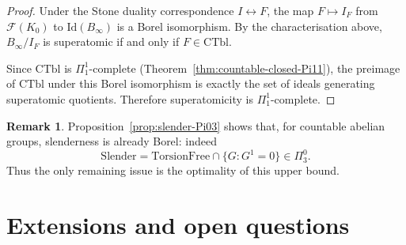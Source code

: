 \documentclass[12pt,fleqn,a4paper]{amsart}
\numberwithin{equation}{section}
\theoremstyle{definition}
\newtheorem{remark}[theorem]{Remark}
\newcommand{\Id}{\mathrm{Id}}
\newcommand{\CTbl}{\mathrm{CTbl}}
\begin{document}
\begin{proof}
Under the Stone duality correspondence $I\leftrightarrow F$, the map
$F\mapsto I_F$ from $\mathscr F(K_0)$ to $\Id(B_\infty)$ is a Borel isomorphism.
By the characterisation above, $B_\infty/I_F$ is superatomic if and only if
$F\in\CTbl$.

Since $\CTbl$ is $\Pi^1_1$-complete
(Theorem~\ref{thm:countable-closed-Pi11}), the preimage of $\CTbl$ under this
Borel isomorphism is exactly the set of ideals generating superatomic quotients.
Therefore superatomicity is $\Pi^1_1$-complete.
\end{proof}

\begin{remark}\label{rem:slenderness-resolved}
Proposition~\ref{prop:slender-Pi03} shows that, for countable abelian groups,
slenderness is already Borel: indeed
\[
\mathrm{Slender}=\mathrm{TorsionFree}\cap\{G:G^1=0\}
\in \Pi^0_3.
\]
Thus the only remaining issue is the optimality of this upper bound.
\end{remark}

\section{Extensions and open questions}
\end{document}

